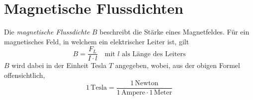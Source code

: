\documentclass{article}
\newcommand{\ounit}[1]{
 1\,\text{#1} 
}
\begin{document}
\section{Magnetische Flussdichten}
Die \emph{magnetische Flussdichte} $B$ beschreibt die Stärke eines Magnetfeldes. Für ein magnetisches Feld, in welchem ein elektrischer Leiter ist, gilt
\[
 B = \frac{F_L}{I \cdot l} 
 \quad \text{mit $l$ als Länge des Leiters} 
\]
$B$ wird dabei in der Einheit Tesla $T$ angegeben, wobei, aus der obigen Formel offensichtlich,
\[ 
 \ounit{Tesla} = \frac{\ounit{Newton}}{\ounit{Ampere} \cdot \ounit{Meter}}
\] 
\end{document}
